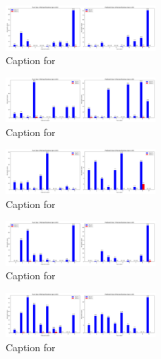 \documentclass[12pt, a4paper]{article}
\begin{document}
\begin{figure}[ht]
\centering
\includegraphics[width=0.5\textwidth]{combined_class_boundary_pgd/combined_class_4_misclassifications_eps_0.05.png}
\caption{Caption for }
\label{fig:combined_class_4_misclassifications_eps_0.05.png}
\end{figure}

\begin{figure}[ht]
\centering
\includegraphics[width=0.5\textwidth]{combined_class_boundary_pgd/combined_class_5_misclassifications_eps_0.05.png}
\caption{Caption for }
\label{fig:combined_class_5_misclassifications_eps_0.05.png}
\end{figure}

\begin{figure}[ht]
\centering
\includegraphics[width=0.5\textwidth]{combined_class_boundary_pgd/combined_class_6_misclassifications_eps_0.05.png}
\caption{Caption for }
\label{fig:combined_class_6_misclassifications_eps_0.05.png}
\end{figure}

\begin{figure}[ht]
\centering
\includegraphics[width=0.5\textwidth]{combined_class_boundary_pgd/combined_class_7_misclassifications_eps_0.05.png}
\caption{Caption for }
\label{fig:combined_class_7_misclassifications_eps_0.05.png}
\end{figure}

\begin{figure}[ht]
\centering
\includegraphics[width=0.5\textwidth]{combined_class_boundary_pgd/combined_class_8_misclassifications_eps_0.05.png}
\caption{Caption for }
\label{fig:combined_class_8_misclassifications_eps_0.05.png}
\end{figure}
\end{document}

